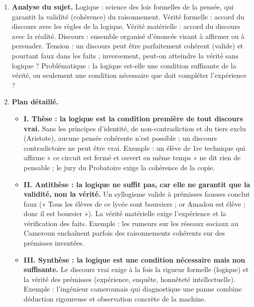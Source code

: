 \documentclass[11pt]{article}
\newcommand{\cle}[1]{{\popxbold\color{popdark}#1}}
\begin{document}
\begin{corrige}
\begin{enumerate}
    \item \textbf{Analyse du sujet.} \cle{Logique} : science des lois formelles de la pensée, qui garantit la validité (cohérence) du raisonnement. \cle{Vérité formelle} : accord du discours avec les règles de la logique. \cle{Vérité matérielle} : accord du discours avec la réalité. \cle{Discours} : ensemble organisé d'énoncés visant à affirmer ou à persuader. Tension : un discours peut être parfaitement cohérent (valide) et pourtant faux dans les faits ; inversement, peut-on atteindre la vérité sans logique ? Problématique : la logique est-elle une condition suffisante de la vérité, ou seulement une condition nécessaire que doit compléter l'expérience ?
    \item \textbf{Plan détaillé.}
    \begin{itemize}
        \item \textbf{I. Thèse : la logique est la condition première de tout discours vrai.} Sans les principes d'identité, de non-contradiction et du tiers exclu (Aristote), aucune pensée cohérente n'est possible ; un discours contradictoire ne peut être vrai. Exemple : un élève de 1re technique qui affirme « ce circuit est fermé et ouvert en même temps » ne dit rien de pensable ; le jury du Probatoire exige la cohérence de la copie.
        \item \textbf{II. Antithèse : la logique ne suffit pas, car elle ne garantit que la validité, non la vérité.} Un syllogisme valide à prémisses fausses conclut faux (« Tous les élèves de ce lycée sont boursiers ; or Amadou est élève ; donc il est boursier »). La vérité matérielle exige l'expérience et la vérification des faits. Exemple : les rumeurs sur les réseaux sociaux au Cameroun enchaînent parfois des raisonnements cohérents sur des prémisses inventées.
        \item \textbf{III. Synthèse : la logique est une condition nécessaire mais non suffisante.} Le discours vrai exige à la fois la rigueur formelle (logique) et la vérité des prémisses (expérience, enquête, honnêteté intellectuelle). Exemple : l'ingénieur camerounais qui diagnostique une panne combine déduction rigoureuse et observation concrète de la machine.
    \end{itemize}

\end{enumerate}
\end{corrige}
\end{document}
